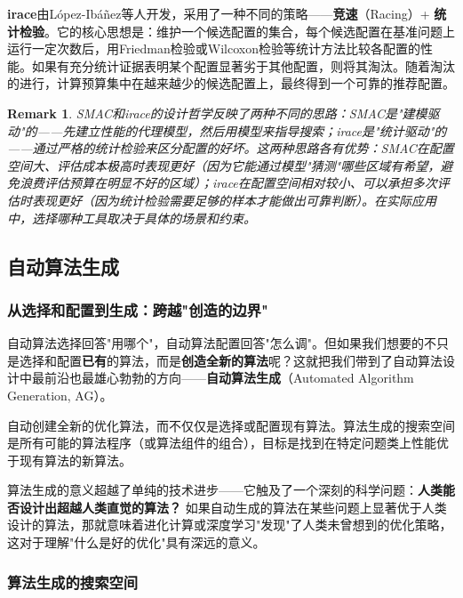 \documentclass[lang=cn,zihao=-4,a4paper,fontset=windows]{beautybook}
\newtheorem*{remark}{\textbf{Remark}}
\begin{document}
\textbf{irace}由López-Ibáñez等人开发，采用了一种不同的策略——\textbf{竞速}（Racing）+ \textbf{统计检验}。它的核心思想是：维护一个候选配置的集合，每个候选配置在基准问题上运行一定次数后，用Friedman检验或Wilcoxon检验等统计方法比较各配置的性能。如果有充分统计证据表明某个配置显著劣于其他配置，则将其淘汰。随着淘汰的进行，计算预算集中在越来越少的候选配置上，最终得到一个可靠的推荐配置。

\begin{remark}
SMAC和irace的设计哲学反映了两种不同的思路：SMAC是"建模驱动"的——先建立性能的代理模型，然后用模型来指导搜索；irace是"统计驱动"的——通过严格的统计检验来区分配置的好坏。这两种思路各有优势：SMAC在配置空间大、评估成本极高时表现更好（因为它能通过模型"猜测"哪些区域有希望，避免浪费评估预算在明显不好的区域）；irace在配置空间相对较小、可以承担多次评估时表现更好（因为统计检验需要足够的样本才能做出可靠判断）。在实际应用中，选择哪种工具取决于具体的场景和约束。
\end{remark}

\subsection{自动算法生成}

\subsubsection{从选择和配置到生成：跨越"创造的边界"}

自动算法选择回答"用哪个"，自动算法配置回答"怎么调"。但如果我们想要的不只是选择和配置\textbf{已有}的算法，而是\textbf{创造全新的算法}呢？这就把我们带到了自动算法设计中最前沿也最雄心勃勃的方向——\textbf{自动算法生成}（Automated Algorithm Generation, AG）。

\begin{definition}
自动创建全新的优化算法，而不仅仅是选择或配置现有算法。算法生成的搜索空间是所有可能的算法程序（或算法组件的组合），目标是找到在特定问题类上性能优于现有算法的新算法。
\end{definition}

算法生成的意义超越了单纯的技术进步——它触及了一个深刻的科学问题：\textbf{人类能否设计出超越人类直觉的算法？} 如果自动生成的算法在某些问题上显著优于人类设计的算法，那就意味着进化计算或深度学习"发现"了人类未曾想到的优化策略，这对于理解"什么是好的优化"具有深远的意义。

\subsubsection{算法生成的搜索空间}
\end{document}
